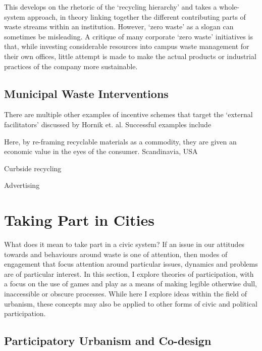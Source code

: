 \documentclass[nofonts,nols,justified,nobib]{tufte-book}
\begin{document}
This develops on the rhetoric of the `recycling hierarchy' and takes a whole-system approach, in theory linking together the different contributing parts of waste streams within an institution. However, `zero waste' as a slogan can sometimes be misleading. A critique of many corporate `zero waste' initiatives is that, while investing considerable resources into campus waste management for their own offices, little attempt is made to make the actual products or industrial practices of the company more sustainable.



\subsection*{Municipal Waste Interventions}

There are multiple other examples of incentive schemes that target the `external facilitators' discussed by Hornik et. al. Successful examples include 

Here, by re-framing recyclable materials as a commodity, they are given an economic value in the eyes of the consumer. Scandinavia, USA

Curbside recycling

Advertising

\section*{Taking Part in Cities}
What does it mean to take part in a civic system? If an issue in our attitudes towards and behaviours around waste is one of attention, then modes of engagement that focus attention around particular issues, dynamics and problems are of particular interest. In this section, I explore theories of participation, with a focus on the use of games and play as a means of making legible otherwise dull, inaccessible or obscure processes. While here I explore ideas within the field of urbanism, these concepts may also be applied to other forms of civic and political participation.

\subsection*{Participatory Urbanism and Co-design}
\end{document}
